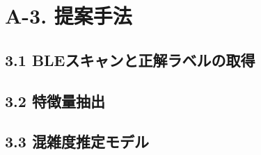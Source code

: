 \section*{A-3. 提案手法}

\subsection*{3.1 BLEスキャンと正解ラベルの取得}

\subsection*{3.2 特徴量抽出}

\subsection*{3.3 混雑度推定モデル}